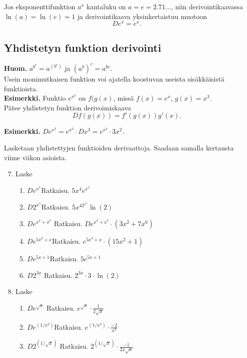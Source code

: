 \documentclass[10pt]{article}
\newcommand{\ratkaisu}[1]{\hfill{\color{blue}\quad\textrm{Ratkaisu. } #1}}
\begin{document}
Jos eksponenttifunktion $a^x$ kantaluku on $a=e=2.71\ldots$, niin derivointikaavassa $\ln(a)=\ln(e)=1$ ja derivointikaava yksinkertaistuu muotoon
$$
De^x=e^x.
$$

\newpage
\subsection{Yhdistetyn funktion derivointi}

\textbf{Huom.} $a^{b^c}=a^{(b^c)}$ ja $(a^b)^c=a^{bc}$.\\

Usein monimutkaisen funktion voi ajatella koostuvan useista sisäkkäisistä funktioista.\\

\textbf{Esimerkki.} Funktio $e^{x^3}$ on $f(g(x)$, missä $f(x)=e^x$, $g(x)=x^3$.\\

Pätee yhdistetyn funktion derivoimiskaava
$$
Df(g(x))=f'(g(x))g'(x).
$$

\textbf{Esimerkki.} $D e^{x^3}=e^{x^3}\cdot Dx^3=e^{x^3}\cdot 3x^2$.

Lasketaan yhdistettyjen funktioiden derivaattoja. Saadaan samalla kertausta viime viikon asioista.

\begin{enumerate}
\setcounter{enumi}{6}
\item Laske
\begin{enumerate}
\item $De^{x^5}$\ratkaisu{$5x^4e^{x^5}$}
\item $D2^{x^5}$\ratkaisu{$5x^42^{x^5}\ln(2)$}
\item $De^{x^3+x^7}$
\ratkaisu{$De^{x^3+x^7}\cdot (3x^2+7x^6)$}
\item $De^{5x^3+x}$\ratkaisu{$e^{5x^3+x}\cdot (15x^2+1)$}
\item $De^{5x+1}$\ratkaisu{$5e^{5x+1}$}
\item $D2^{3x}$
\ratkaisu{$2^{3x}\cdot 3\cdot \ln(2)$}
\end{enumerate}
\item Laske
\begin{enumerate}
\item $De^{\sqrt{x}}$
\ratkaisu{$e^{\sqrt{x}}\cdot\frac{1}{2\sqrt{x}}$}
\item $De^{(1/x^2)}$\ratkaisu{$e^{(1/x^2)}\cdot\frac{-2}{x^3}$}
\item $D2^{(1/\sqrt{x})}$
\ratkaisu{$2^{(1/\sqrt{x})}\cdot\frac{-1}{2x\sqrt{x}}$}
\end{enumerate}
\end{enumerate}
\end{document}
